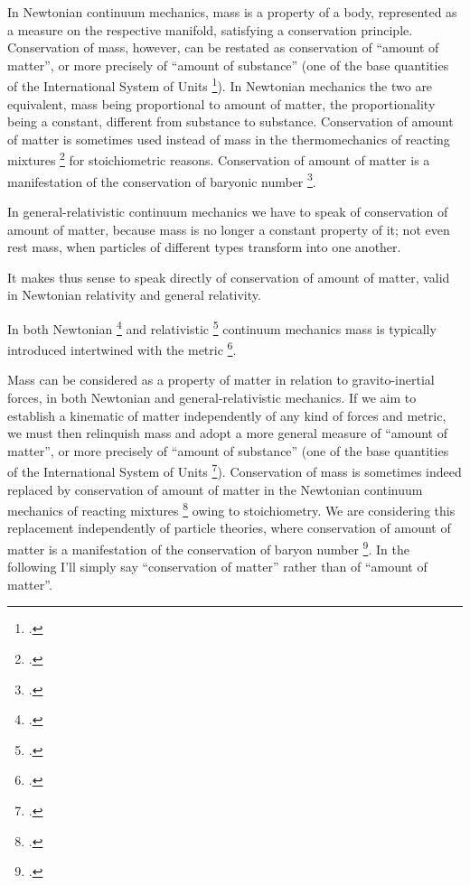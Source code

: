 \documentclass[\ifafour a4paper,12pt,\else a5paper,10pt,\fi%
onecolumn,oneside,article,%
british%
]{memoir}
\theoremstyle{remark}
\theoremstyle{innote}
\newcommand*{\citep}{\footcites}
\renewcommand*{\|}[1][]{\nonscript\,#1\vert\nonscript\;\mathopen{}}
\newcommand*{\sect}{\S}%
\newcommand*{\sects}{\S\S}%
\newcommand*{\chap}{ch.}%
\newcommand*{\eqn}{eq.}%
\newcommand*{\eg}{{e.g.}}
\newcommand*{\cf}{{cf.}}
\begin{document}
In Newtonian continuum mechanics, mass is a property of a body, represented
as a measure on the respective manifold, satisfying a conservation
principle. Conservation of mass, however, can be restated as conservation
of \enquote{amount of matter}, or more precisely of \enquote{amount of
  substance} (one of the base quantities of the International System of
Units \citep{iso2009,jcgm1997_r2012}). In Newtonian mechanics the two are
equivalent, mass being proportional to amount of matter, the
proportionality being a constant, different from substance to substance.
Conservation of amount of matter is sometimes used instead of mass in the
thermomechanics of reacting mixtures \citep[\eg][(see especially \eqn~(7),
where $m$ can be dropped)]{eckart1940b}[Lect.~6 (in \eqn~(6.1) $\rho$ can
be dropped)]{truesdell1969_r1984}[and refs therein]{samohyletal1987_r2014}
for stoichiometric reasons. Conservation of amount of matter is a
manifestation of the conservation of baryonic number
\citep[\cf][\sect~22.2]{misneretal1970_r1973}.

In general-relativistic continuum mechanics we have to speak of
conservation of amount of matter, because mass is no longer a constant
property of it; not even rest mass, when particles of different types
transform into one another.

It makes thus sense to speak directly of conservation of amount of matter,
valid in Newtonian relativity and general relativity.


In both Newtonian
\citep[\sects~I.4]{truesdell1977_r1991}{noll1959,noll1973} and relativistic
\citep{grotetal1966}[\chap~3]{rezzollaetal2013} continuum mechanics mass is
typically introduced intertwined with the metric \citep[being an
exception]{carteretal1972}.

Mass can be considered as a property of matter in relation to
gravito-inertial forces, in both Newtonian and general-relativistic
mechanics. If we aim to establish a kinematic of matter independently of
any kind of forces and metric, we must then relinquish mass and adopt a
more general measure of \enquote{amount of matter}, or more precisely of
\enquote{amount of substance} (one of the base quantities of the
International System of Units \citep{iso2009,iso2009d,jcgm1997_r2012}).
Conservation of mass is sometimes indeed replaced by conservation of amount
of matter in the Newtonian continuum mechanics of reacting mixtures
\citep[\eg][(see especially \eqn~(7), where $m$ can be
dropped)]{eckart1940b}[Lect.~6 (in \eqn~(6.1) $\rho$ can be
dropped)]{truesdell1969_r1984}[\sects~4.1--4.2 and refs
therein]{samohyletal1987_r2014} %
owing to stoichiometry. We are considering this replacement independently
of particle theories, where conservation of amount of matter is a
manifestation of the conservation of baryon number
\citep[\cf][\sect~22.2]{misneretal1970_r1973}. In the following I'll simply
say \enquote{conservation of matter} rather than of \enquote{amount of
  matter}.
\end{document}
